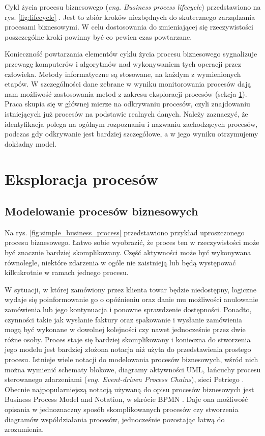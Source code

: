 Cykl życia procesu biznesowego (\textit{eng. Business process lifecycle}) przedstawiono na rys. \ref{fig:lifecycle} \cite{dumas2013fundamentals}. Jest to zbiór kroków niezbędnych do skutecznego zarządzania procesami biznesowymi. W celu dostosowania do zmieniającej się rzeczywistości poszczególne kroki powinny być co pewien czas powtarzane. 

Konieczność powtarzania elementów cyklu życia procesu biznesowego sygnalizuje przewagę komputerów i algorytmów nad wykonywaniem tych operacji przez człowieka. Metody informatyczne są stosowane, na każdym z wymienionych etapów. W szczególności dane zebrane w wyniku monitorowania procesów dają nam możliwość zastosowania metod z zakresu eksploracji procesów (sekcja \ref{sec:eksploracja}). Praca skupia się w głównej mierze na odkrywaniu procesów, czyli znajdowaniu istniejących już procesów na podstawie realnych danych. Należy zaznaczyć, że identyfikacja polega na ogólnym rozpoznaniu i nazwaniu zachodzących procesów, podczas gdy odkrywanie jest bardziej szczegółowe, a w jego wyniku otrzymujemy dokładny model.  


\section{Eksploracja procesów}
\label{sec:eksploracja}
\subsection{Modelowanie procesów biznesowych}
Na rys. \ref{fig:simple_business_process} przedstawiono przykład uproszczonego procesu biznesowego. Łatwo sobie wyobrazić, że proces ten w rzeczywistości może być znacznie bardziej skomplikowany. Część aktywności może być wykonywana równolegle, niektóre zdarzenia w ogóle nie zaistnieją lub będą występować kilkukrotnie w ramach jednego procesu. 

W sytuacji, w której zamówiony przez klienta towar będzie niedostępny, logiczne wydaje się poinformowanie go o opóźnieniu oraz danie mu możliwości anulowanie zamówienia lub jego kontynuacja i ponowne sprawdzenie dostępności. Ponadto, czynności takie jak wysłanie faktury oraz spakowanie i wysłanie zamówienia mogą być wykonane w dowolnej kolejności czy nawet jednocześnie przez dwie różne osoby. Proces staje się bardziej skomplikowany i konieczna do stworzenia jego modelu jest bardziej złożona notacja niż użyta do przedstawienia prostego procesu. 
Istnieje wiele notacji do modelowania procesów biznesowych, wśród nich można wymienić schematy blokowe, diagramy aktywności UML, łańcuchy procesu sterowanego zdarzeniami (\textit{eng. Event-driven Process Chains}), sieci Petriego \cite{BPMComparission}. Obecnie najpopularniejszą notacją używaną do opisu procesów biznesowych jest Business Process  Model and Notation, w skrócie BPMN \cite{omg2011bpmn}. Daje ona możliwość opisania w jednoznaczny sposób skomplikowanych procesów czy stworzenia diagramów współdziałania procesów, jednocześnie pozostając łatwą do zrozumienia.

